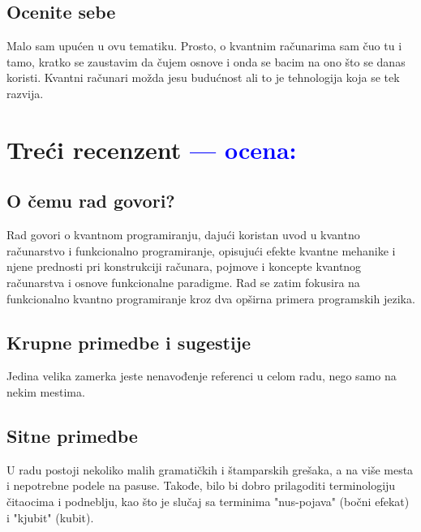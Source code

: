 \documentclass[a4paper]{report}
\newcommand{\odgovor}[1]{\textcolor{blue}{#1}}
\begin{document}
\section{Ocenite sebe}

Malo sam upućen u ovu tematiku. Prosto, o kvantnim računarima sam čuo tu i tamo, 
kratko se zaustavim da čujem osnove i onda se bacim na ono što se danas koristi. 
Kvantni računari možda jesu budućnost ali to je tehnologija koja se tek razvija. 



\chapter{Treći recenzent \odgovor{--- ocena:} }

\section{O čemu rad govori?}
Rad govori o kvantnom programiranju, dajući koristan uvod u kvantno računarstvo i funkcionalno programiranje, opisujući efekte kvantne mehanike i njene prednosti pri konstrukciji računara, pojmove i koncepte kvantnog računarstva i osnove funkcionalne paradigme. Rad se zatim fokusira na funkcionalno kvantno programiranje kroz dva opširna primera programskih jezika.

\section{Krupne primedbe i sugestije}
Jedina velika zamerka jeste nenavođenje referenci u celom radu, nego samo na nekim mestima. 

\section{Sitne primedbe}
U radu postoji nekoliko malih gramatičkih  i štamparskih grešaka, a na više mesta i nepotrebne podele na pasuse. Takođe, bilo bi dobro prilagoditi terminologiju čitaocima i podneblju, kao što je slučaj sa terminima "nus-pojava" (bočni efekat) i "kjubit" (kubit).
\end{document}
